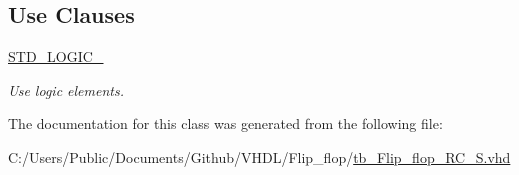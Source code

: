 \subsection*{Use Clauses}
 \begin{DoxyCompactItemize}
\item 
\hyperlink{classtb___flip__flop___r_c___s_aa4b2b25246a821511120e3149b003563}{S\+T\+D\+\_\+\+L\+O\+G\+I\+C\+\_}   \hypertarget{classtb___flip__flop___r_c___s_aa4b2b25246a821511120e3149b003563}{}\label{classtb___flip__flop___r_c___s_aa4b2b25246a821511120e3149b003563}

\begin{DoxyCompactList}\small\item\em Use logic elements. \end{DoxyCompactList}\end{DoxyCompactItemize}


The documentation for this class was generated from the following file\+:\begin{DoxyCompactItemize}
\item 
C\+:/\+Users/\+Public/\+Documents/\+Github/\+V\+H\+D\+L/\+Flip\+\_\+flop/\hyperlink{tb___flip__flop___r_c___s_8vhd}{tb\+\_\+\+Flip\+\_\+flop\+\_\+\+R\+C\+\_\+\+S.\+vhd}\end{DoxyCompactItemize}
